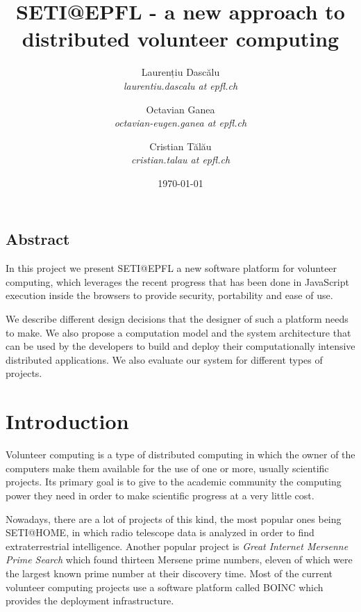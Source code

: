 \documentclass[letterpaper,twocolumn,10pt]{article}
\begin{document}
\date{\today}

\title{\Large \bf SETI@EPFL - a new approach to distributed volunteer computing}
\author{
{\rm Laurențiu Dascălu}\\
{\small \textit{laurentiu.dascalu at epfl.ch}}
\and
{\rm Octavian Ganea}\\
{\small \textit{octavian-eugen.ganea at epfl.ch}}
\and
{\rm Cristian Tălău}\\
{\small \textit{cristian.talau at epfl.ch}}
}

\maketitle

\thispagestyle{empty}

\subsection*{Abstract}

In this project we present SETI@EPFL a new software platform for volunteer
computing, which leverages the recent progress that has been done in
JavaScript\cite{javascript} execution inside the browsers to provide security,
portability and ease of use.
 
We describe different design decisions that the designer of such a platform
needs to make. We also propose a computation model and the system architecture
that can be used by the developers to build and deploy their computationally 
intensive distributed applications. We also evaluate our system for different 
types of projects.

\section{Introduction}

Volunteer computing is a type of distributed computing in which the owner of
the computers make them available for the use of one or more, usually scientific
projects. Its primary goal is to give to the academic community the computing
power they need in order to make scientific progress at a very little cost. 

Nowadays, there are a lot of projects of this kind, the most popular ones being
SETI@HOME, in which radio telescope data is analyzed in order to find
extraterrestrial intelligence. Another popular project is {\it Great Internet 
Mersenne Prime Search} which found thirteen Mersene prime numbers, eleven of
which were the largest known prime number at their discovery time. Most of the 
current volunteer computing projects use a software platform called BOINC
\cite{boinc} which provides the deployment infrastructure. 
\end{document}
